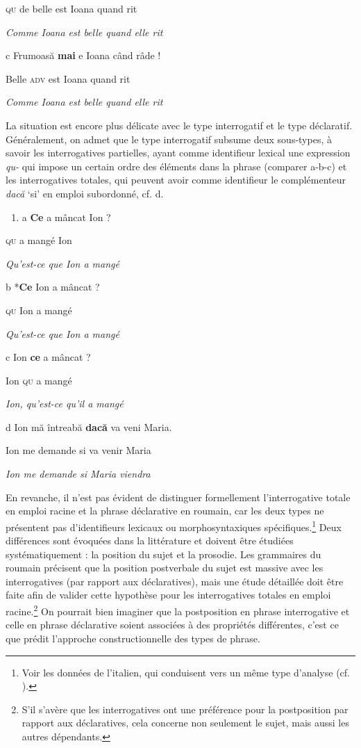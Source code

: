     \textsc{qu } de  belle  est  Ioana  quand  rit

{\itshape
Comme Ioana est belle quand elle rit} 

  c  Frumoasă  \textbf{mai}  e  Ioana  când  râde ! 

    Belle  \textsc{adv } est  Ioana  quand  rit

{\itshape
Comme Ioana est belle quand elle rit}

La situation est encore plus délicate avec le type interrogatif et le type déclaratif. Généralement, on admet que le type interrogatif subsume deux sous-types, à savoir les interrogatives partielles, ayant comme identifieur lexical une expression \textit{qu-} qui impose un certain ordre des éléments dans la phrase (comparer a-b-c) et les interrogatives totales, qui peuvent avoir comme identifieur le complémenteur \textit{dacă} `si' en emploi subordonné, cf. d.  


\begin{enumerate}
\item \label{bkm:Ref299128534}a  \textbf{Ce } a  mâncat  Ion ?


\end{enumerate}
\textsc{qu}  a  mangé  Ion

{\itshape
Qu'est-ce que Ion a mangé~}

  b  *\textbf{Ce } Ion  a  mâncat ?

\textsc{qu}  Ion  a  mangé

{\itshape
Qu'est-ce que Ion a mangé~}

  c  Ion  \textbf{ce } a  mâncat ?

Ion\textsc{  qu}  a  mangé

{\itshape
Ion, qu'est-ce qu'il a mangé~}

  d  Ion  mă  întreabă  \textbf{dacă}  va  veni  Maria.

    Ion  me  demande  si  va  venir  Maria

{\itshape
Ion me demande si Maria viendra}

En revanche, il n'est pas évident de distinguer formellement l'interrogative totale en emploi racine et la phrase déclarative en roumain, car les deux types ne présentent pas d'identifieurs lexicaux ou morphosyntaxiques spécifiques.\footnote{Voir les données de l'italien, qui conduisent vers un même type d'analyse (cf. \citet{Petrone2008}).} Deux différences sont évoquées dans la littérature et doivent être étudiées systématiquement : la position du sujet et la prosodie. Les grammaires du roumain précisent que la position postverbale du sujet est massive avec les interrogatives (par rapport aux déclaratives), mais une étude détaillée doit être faite afin de valider cette hypothèse pour les interrogatives totales en emploi racine.\footnote{S'il s'avère que les interrogatives ont une préférence pour la postposition par rapport aux déclaratives, cela concerne non seulement le sujet, mais aussi les autres dépendants.}  On pourrait bien imaginer que la postposition en phrase interrogative et celle en phrase déclarative soient associées à des propriétés différentes, c'est ce que prédit l'approche constructionnelle des types de phrase. 

